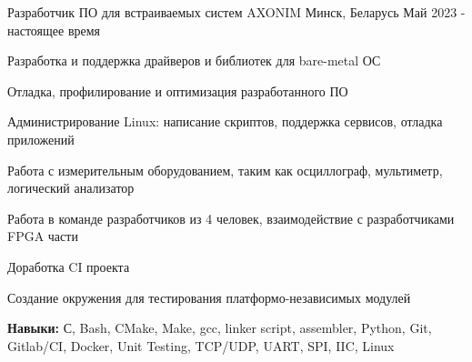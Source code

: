
\begin{cventries}

  \cventry
    {Разработчик ПО для встраиваемых систем} %
    {AXONIM} %
    {Минск, Беларусь} %
    {Май 2023 - настоящее время} %
    {
      \begin{cvitems} %
        \item {Разработка и поддержка драйверов и библиотек для bare-metal ОС}
        \item {Отладка, профилирование и оптимизация разработанного ПО}
        \item {Администрирование Linux: написание скриптов, поддержка сервисов, отладка приложений}
        \item {Работа с измерительным оборудованием, таким как осциллограф, мультиметр, логический анализатор}
        \item {Работа в команде разработчиков из 4 человек, взаимодействие с разработчиками FPGA части}
        \item {Доработка CI проекта}
        \item {Создание окружения для тестирования платформо-независимых модулей}
        \item {\textbf{Навыки:} С, Bash, CMake, Make, gcc, linker script, assembler, Python, Git, Gitlab/CI, Docker, Unit Testing, TCP/UDP, UART, SPI, IIC, Linux}
      \end{cvitems}
    }
\end{cventries}
